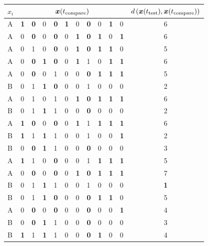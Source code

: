 \begin{table}[!b]
\centering
\footnotesize
\begin{tabular}{l|llllllllll|c}
$x_i$ & \multicolumn{10}{c|}{$\bm x(t_{\text{compare}})$} & $d\left(\bm x(t_{\text{test}}), \bm x(t_{\text{compare}}) \right)$ \\
\hline
A & \textbf{1} & \textbf{0} & 0 & \textbf{0} & \textbf{1} & 0 & \textbf{0} & 0 & \textbf{1} & 0 & 6 \\
A & 0 & \textbf{0} & 0 & \textbf{0} & 0 & \textbf{1} & \textbf{0} & \textbf{1} & 0 & \textbf{1} & 6 \\
A & 0 & 1 & 0 & \textbf{0} & 0 & \textbf{1} & \textbf{0} & \textbf{1} & \textbf{1} & 0 & 5 \\
A & 0 & \textbf{0} & \textbf{1} & \textbf{0} & 0 & \textbf{1} & 1 & 0 & \textbf{1} & \textbf{1} & 6 \\
A & 0 & \textbf{0} & 0 & 1 & 0 & 0 & \textbf{0} & \textbf{1} & \textbf{1} & \textbf{1} & 5 \\
B & 0 & 1 & \textbf{1} & \textbf{0} & 0 & 0 & 1 & 0 & 0 & 0 & 2 \\
A & 0 & 1 & 0 & 1 & 0 & \textbf{1} & \textbf{0} & \textbf{1} & \textbf{1} & \textbf{1} & 6 \\
B & 0 & 1 & \textbf{1} & 1 & 0 & 0 & \textbf{0} & 0 & 0 & 0 & 2 \\
A & \textbf{1} & \textbf{0} & 0 & \textbf{0} & 0 & \textbf{1} & 1 & \textbf{1} & \textbf{1} & \textbf{1} & 6 \\
B & \textbf{1} & 1 & \textbf{1} & 1 & 0 & 0 & 1 & 0 & 0 & \textbf{1} & 2 \\
B & 0 & \textbf{0} & \textbf{1} & 1 & 0 & 0 & \textbf{0} & 0 & 0 & 0 & 3 \\
A & \textbf{1} & 1 & 0 & \textbf{0} & 0 & 0 & 1 & \textbf{1} & \textbf{1} & \textbf{1} & 5 \\
A & 0 & \textbf{0} & 0 & \textbf{0} & 0 & \textbf{1} & \textbf{0} & \textbf{1} & \textbf{1} & \textbf{1} & 7 \\
B & 0 & 1 & \textbf{1} & 1 & 0 & 0 & 1 & 0 & 0 & 0 & \textbf{1} \\
B & 0 & 1 & \textbf{1} & \textbf{0} & 0 & 0 & \textbf{0} & \textbf{1} & \textbf{1} & 0 & 5 \\
A & 0 & \textbf{0} & 0 & \textbf{0} & 0 & 0 & \textbf{0} & 0 & 0 & \textbf{1} & 4 \\
B & 0 & \textbf{0} & \textbf{1} & 1 & 0 & 0 & \textbf{0} & 0 & 0 & 0 & 3 \\
B & \textbf{1} & 1 & \textbf{1} & 1 & 0 & 0 & \textbf{0} & \textbf{1} & 0 & 0 & 4 \\

\end{tabular}
\end{table}

